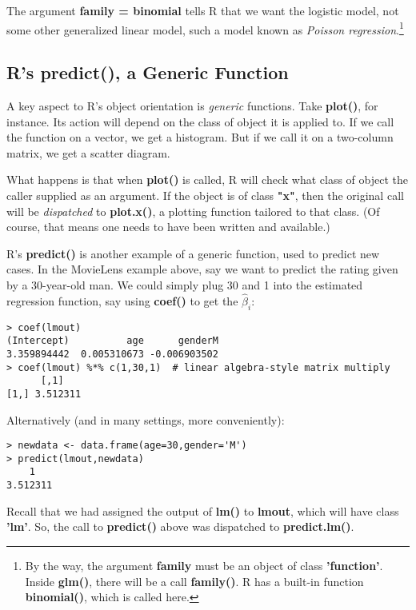 The argument \textbf{family = binomial} tells R that we want the
logistic model, not some other generalized linear model, such a model
known as \textit{Poisson regression}.\footnote{By the way, the argument
\textbf{family} must be an object of class \textbf{'function'}.  Inside
\textbf{glm()}, there will be a call \textbf{family()}.  R has a
built-in function \textbf{binomial()}, which is called here.}

\subsection{R's predict(), a Generic Function}

A key aspect to R's object orientation is \textit{generic} functions.
Take \textbf{plot()}, for instance.  Its action will depend on the class
of object it is applied to.  If we call the function on a vector, we get
a histogram.  But if we call it on a two-column matrix, we get a scatter
diagram.

What happens is that when \textbf{plot()} is called, R will check what
class of object the caller supplied as an argument.  If the object is of
class \textbf{"x"}, then the original call will be \textit{dispatched}
to \textbf{plot.x()}, a plotting function tailored to that class.  (Of
course, that means one needs to have been written and available.)

R's \textbf{predict()} is another example of a generic function, used to
predict new cases.  In the MovieLens example above, say we want to
predict the rating given by a 30-year-old man.  We could simply plug
30 and 1 into the estimated regression function, say using
\textbf{coef()} to get the $\widehat{\beta}_i$:

\begin{lstlisting}
> coef(lmout)
(Intercept)          age      genderM 
3.359894442  0.005310673 -0.006903502 
> coef(lmout) %*% c(1,30,1)  # linear algebra-style matrix multiply
      [,1]
[1,] 3.512311
\end{lstlisting}

Alternatively (and in many settings, more conveniently):

\begin{lstlisting}
> newdata <- data.frame(age=30,gender='M')
> predict(lmout,newdata)
    1 
3.512311 
\end{lstlisting}

Recall that we had assigned the output of \textbf{lm()} to
\textbf{lmout}, which will have class \textbf{'lm'}.  So, the call to
\textbf{predict()} above was dispatched to \textbf{predict.lm()}.

